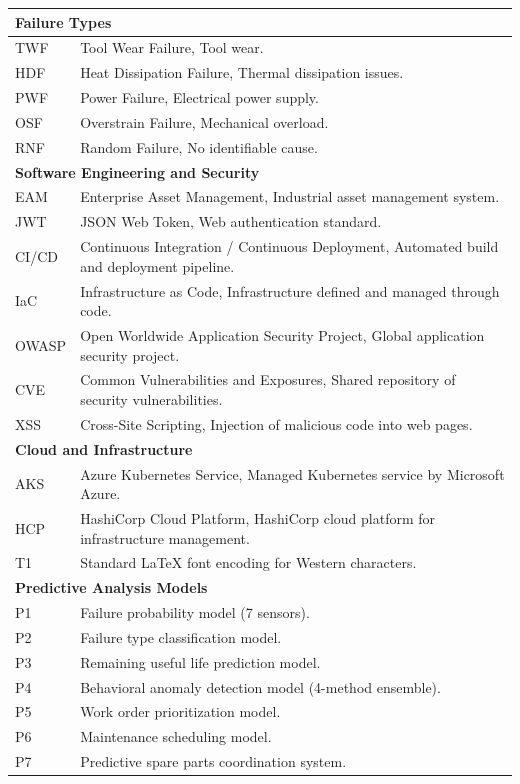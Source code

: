 \begin{small}
\begin{longtable}{|l|p{9.5cm}|}
\multicolumn{2}{|l|}{\textbf{Failure Types}} \\
\hline
TWF & Tool Wear Failure, Tool wear. \\
\hline
HDF & Heat Dissipation Failure, Thermal dissipation issues. \\
\hline
PWF & Power Failure, Electrical power supply. \\
\hline
OSF & Overstrain Failure, Mechanical overload. \\
\hline
RNF & Random Failure, No identifiable cause. \\
\hline

\multicolumn{2}{|l|}{\textbf{Software Engineering and Security}} \\
\hline
EAM & Enterprise Asset Management, Industrial asset management system. \\
\hline
JWT & JSON Web Token, Web authentication standard. \\
\hline
CI/CD & Continuous Integration / Continuous Deployment, Automated build and deployment pipeline. \\
\hline
IaC & Infrastructure as Code, Infrastructure defined and managed through code. \\
\hline
OWASP & Open Worldwide Application Security Project, Global application security project. \\
\hline
CVE & Common Vulnerabilities and Exposures, Shared repository of security vulnerabilities. \\
\hline
XSS & Cross-Site Scripting, Injection of malicious code into web pages. \\
\hline

\multicolumn{2}{|l|}{\textbf{Cloud and Infrastructure}} \\
\hline
AKS & Azure Kubernetes Service, Managed Kubernetes service by Microsoft Azure. \\
\hline
HCP & HashiCorp Cloud Platform, HashiCorp cloud platform for infrastructure management. \\
\hline
T1 & Standard \LaTeX{} font encoding for Western characters. \\
\hline

\multicolumn{2}{|l|}{\textbf{Predictive Analysis Models}} \\
\hline
P1 & Failure probability model (7 sensors). \\
\hline
P2 & Failure type classification model. \\
\hline
P3 & Remaining useful life prediction model. \\
\hline
P4 & Behavioral anomaly detection model (4-method ensemble). \\
\hline
P5 & Work order prioritization model. \\
\hline
P6 & Maintenance scheduling model. \\
\hline
P7 & Predictive spare parts coordination system. \\
\hline

\end{longtable}
\end{small}
